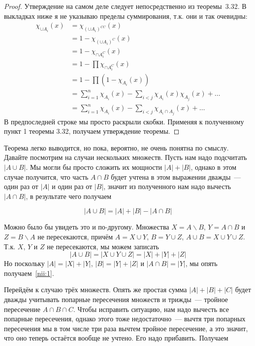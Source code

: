 \begin{proof}
Утверждение на самом деле следует непосредственно из теоремы~3.32. В выкладках ниже я не указываю пределы суммирования, т.к. они и так очевидны:
\begin{align*}
\chi_{\cup A_i}(x) &= \chi_{(\cup A_i)^{CC}}(x) \\
&= 1 -  \chi_{(\cup A_i)^C}(x) \\
&= 1 - \chi_{\cap A_i^C}(x) \\
&= 1 - \prod \chi_{\cap A_i^C}(x) \\
&= 1 - \prod (1 - \chi_{A_i}(x)) \\
&= \sum_{i=1}^n\chi_{A_i}(x) - \sum_{i<j}\chi_{A_i}(x)\chi_{A_j}(x) +\ldots\\
&= \sum_{i=1}^n\chi_{A_i}(x) - \sum_{i<j}\chi_{A_i\cap A_j}(x) +\ldots
\end{align*}
В предпоследней строке мы просто раскрыли скобки. Применяя к полученному пункт 1 теоремы 3.32, получаем утверждение теоремы.
\end{proof}

Теорема легко выводится, но пока, вероятно, не очень понятна по смыслу. Давайте посмотрим на случаи нескольких множеств. Пусть нам надо подсчитать $|A\cup B|$. Мы могли бы просто сложить их мощности $|A| + |B|$, однако в этом случае получится, что часть $A\cap B$ будет учтена в этом выражении дважды~--- один раз от $|A|$ и  один раз от $|B|$, значит из полученного нам надо вычесть $|A\cap B|$, в результате чего получаем

\begin{equation}\label{nii:1}
|A\cup B| = |A| + |B| - |A\cap B|
\end{equation}

Можно было бы увидеть это и по-другому. Множества $X = A\backslash B$, $Y = A\cap B$ и $Z = B\backslash A$ не пересекаются, причём $A = X\cup Y$, $B = Y\cup Z$, $A\cup B = X\cup Y \cup Z$. Т.к. $X$, $Y$ и $Z$ не пересекаются, мы можем записать
$$|A\cup B| = |X\cup Y\cup Z| = |X| + |Y| + |Z|$$
Но поскольку $|A| = |X| + |Y|$, $|B| = |Y| + |Z|$ и $|A\cap B| = |Y|$, мы опять получаем~\eqref{nii:1}.

Перейдём к случаю трёх множеств. Опять же простая сумма $|A|+|B|+|C|$ будет дважды учитывать попарные пересечения множеств и трижды~--- тройное пересечение $A\cap B\cap C$. Чтобы исправить ситуацию, нам надо вычесть все попарные пересечения, однако этого тоже недостаточно~--- вычтя три попарных пересечения мы в том числе три раза вычтем тройное пересечение, а это значит, что оно теперь остаётся вообще не учтено. Его надо прибавить. Получаем

